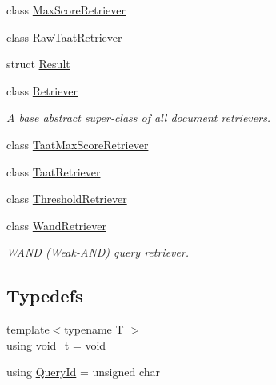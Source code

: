 \begin{DoxyCompactItemize}
\item 
class \mbox{\hyperlink{classbloodhound_1_1query_1_1MaxScoreRetriever}{Max\+Score\+Retriever}}
\item 
class \mbox{\hyperlink{classbloodhound_1_1query_1_1RawTaatRetriever}{Raw\+Taat\+Retriever}}
\item 
struct \mbox{\hyperlink{structbloodhound_1_1query_1_1Result}{Result}}
\item 
class \mbox{\hyperlink{classbloodhound_1_1query_1_1Retriever}{Retriever}}
\begin{DoxyCompactList}\small\item\em A base abstract super-\/class of all document retrievers. \end{DoxyCompactList}\item 
class \mbox{\hyperlink{classbloodhound_1_1query_1_1TaatMaxScoreRetriever}{Taat\+Max\+Score\+Retriever}}
\item 
class \mbox{\hyperlink{classbloodhound_1_1query_1_1TaatRetriever}{Taat\+Retriever}}
\item 
class \mbox{\hyperlink{classbloodhound_1_1query_1_1ThresholdRetriever}{Threshold\+Retriever}}
\item 
class \mbox{\hyperlink{classbloodhound_1_1query_1_1WandRetriever}{Wand\+Retriever}}
\begin{DoxyCompactList}\small\item\em W\+A\+ND (Weak-\/\+A\+ND) query retriever. \end{DoxyCompactList}\end{DoxyCompactItemize}
\subsection*{Typedefs}
\begin{DoxyCompactItemize}
\item 
{\footnotesize template$<$typename T $>$ }\\using \mbox{\hyperlink{namespacebloodhound_1_1query_afd658a38b784a8187f8782905cb901e6}{void\+\_\+t}} = void
\item 
using \mbox{\hyperlink{namespacebloodhound_1_1query_aa67214af106292b2483995adea986b08}{Query\+Id}} = unsigned char
\end{DoxyCompactItemize}
